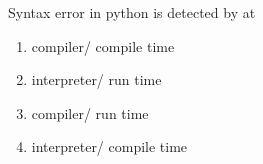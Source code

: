 \question
Syntax error in python is detected by \underline{\hspace{2cm}} at \underline{\hspace{2cm}}

\begin{enumerate}
\item compiler/ compile time
\item interpreter/ run time
\item compiler/ run time
\item interpreter/ compile time
\end{enumerate}

